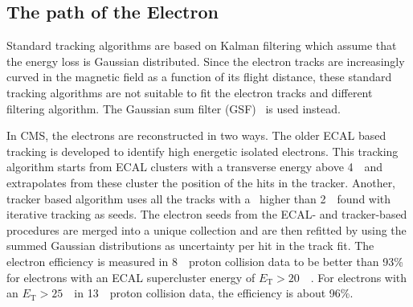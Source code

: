 %


\subsection{The path of the Electron}
\label{sec:ElectronTrack}
 Standard tracking algorithms are based on Kalman filtering which assume that the energy loss is Gaussian distributed. Since the  electron tracks are increasingly curved in the magnetic field as a function of its flight distance, these standard tracking algorithms are not suitable to fit the electron tracks and different filtering algorithm. The Gaussian sum filter (GSF)~\cite{0954-3899-31-9-N01} is used instead. 

In CMS, the electrons are reconstructed in two ways. The older ECAL based tracking is developed to identify high energetic isolated electrons. This tracking algorithm starts from ECAL clusters with a transverse energy above 4~\GeV\ and extrapolates from these cluster the position of the hits in the tracker. Another, tracker based algorithm uses all the tracks with a \pt\ higher than 2~\GeV\ found with iterative tracking as seeds. The electron seeds from the ECAL- and tracker-based procedures are merged into a unique collection and are then refitted  by using the summed Gaussian distributions as uncertainty per hit in the track fit. The electron efficiency is measured in 8~\TeV\ proton collision data to be better than 93\% for electrons with an ECAL supercluster energy of $E_{\mathrm{T}}>20$~\GeV~\cite{1748-0221-10-06-P06005}. For electrons with an  $E_{\mathrm{T}}>25$~\GeV\  in 13~\TeV\ proton collision data, the efficiency is about 96\%\cite{CMS-DP-2017-004}.


